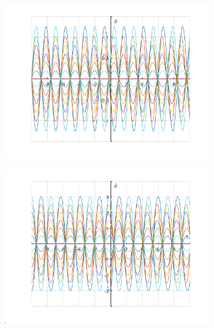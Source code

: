 \documentclass{article}
\begin{document}
	\begin{figure}[h!]
		\graphicspath{{./SmallOscillations/S1} }
		\centering
		\begin{subfigure}[b]{0.48\linewidth}
			\includegraphics[width=\linewidth]{./F1.png}
		\end{subfigure}
		\begin{subfigure}[b]{0.48\linewidth}
			\includegraphics[width=\linewidth]{./F2.png}
		\end{subfigure}
	\end{figure}
	
\end{document}

